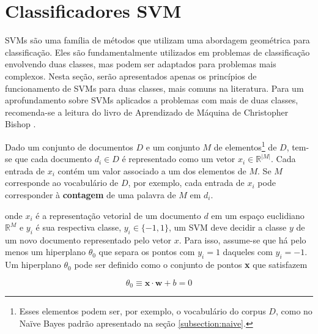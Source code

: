 
\section{Classificadores SVM}
\label{subsection:SVMs}

SVMs são uma família de métodos que utilizam uma abordagem geométrica para classificação. Eles são fundamentalmente utilizados em problemas de classificação envolvendo duas classes, mas podem ser adaptados para problemas mais complexos. Nesta seção, serão apresentados apenas os princípios de funcionamento de SVMs para duas classes, mais comuns na literatura. Para um aprofundamento sobre SVMs aplicados a problemas com mais de duas classes, recomenda-se a leitura do livro de Aprendizado de Máquina de Christopher Bishop \cite{bishop}.

Dado um conjunto de documentos \ensuremath{D} e um conjunto \ensuremath{M} de elementos\footnote{Esses elementos podem ser, por exemplo, o vocabulário do corpus \ensuremath{D}, como no Naïve Bayes padrão apresentado na seção \ref{subsection:naive}.} de \ensuremath{D}, tem-se que cada documento \ensuremath{d_i \in D} é representado como um vetor \ensuremath{x_i \in \mathbb{R}^{|M|}}. Cada entrada de \ensuremath{x_i} contém um valor associado a um dos elementos de \ensuremath{M}. Se \ensuremath{M} corresponde ao vocabulário de \ensuremath{D}, por exemplo, cada entrada de \ensuremath{x_i} pode corresponder à \textbf{contagem} de uma palavra de \ensuremath{M} em \ensuremath{d_i}. 

 onde \ensuremath{x_i} é a representação vetorial de um documento \ensuremath{d} em um espaço euclidiano \ensuremath{\mathbb{R}^M} e \ensuremath{y_i} é sua respectiva classe, \ensuremath{y_i \in \{-1, 1\}}, um SVM deve decidir a classe \ensuremath{y} de um novo documento representado pelo vetor \ensuremath{x}. Para isso, assume-se que há pelo menos um hiperplano \ensuremath{\theta_0} que separa os pontos  com \ensuremath{y_i = 1} daqueles com \ensuremath{y_i = -1}. Um hiperplano \ensuremath{\theta_0} pode ser definido como o conjunto de pontos \textbf{x} que satisfazem \cite{mono-puc}

\begin{equation}
\label{function:svm}
\ensuremath{\theta_0 \equiv} \textbf{x} \ensuremath{\cdot} \textbf{w} + \ensuremath{b} = 0
\end{equation}

